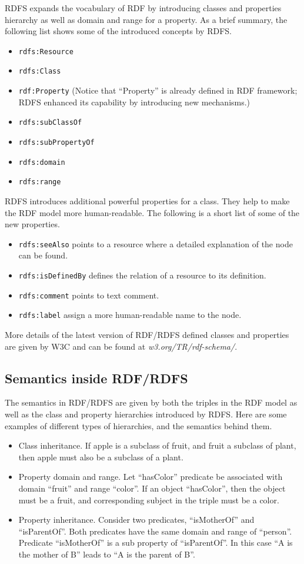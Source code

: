 RDFS expands the vocabulary of RDF by introducing classes and properties hierarchy as well as domain and range for a property. As a brief summary, the following list shows some of the introduced concepts by RDFS.
\begin{itemize}
	\item \verb|rdfs:Resource|
	\item \verb|rdfs:Class|
	\item \verb|rdf:Property| (Notice that ``Property'' is already defined in RDF framework; RDFS enhanced its capability by introducing new mechanisms.)
	\item \verb|rdfs:subClassOf|
	\item \verb|rdfs:subPropertyOf|
	\item \verb|rdfs:domain|
	\item \verb|rdfs:range|
\end{itemize}

RDFS introduces additional powerful properties for a class. They help to make the RDF model more human-readable. The following is a short list of some of the new properties.
\begin{itemize}
	\item \verb|rdfs:seeAlso| points to a resource where a detailed explanation of the node can be found.
	\item \verb|rdfs:isDefinedBy| defines the relation of a resource to its definition.
	\item \verb|rdfs:comment| points to text comment.
	\item \verb|rdfs:label| assign a more human-readable name to the node.
\end{itemize}

More details of the latest version of RDF/RDFS defined classes and properties are given by W3C and can be found at \textit{w3.org/TR/rdf-schema/}.

\subsection{Semantics inside RDF/RDFS}

The semantics in RDF/RDFS are given by both the triples in the RDF model as well as the class and property hierarchies introduced by RDFS. Here are some examples of different types of hierarchies, and the semantics behind them.
\begin{itemize}
	\item Class inheritance. If apple is a subclass of fruit, and fruit a subclass of plant, then apple must also be a subclass of a plant.
	\item Property domain and range. Let ``hasColor'' predicate be associated with domain ``fruit'' and range ``color''. If an object ``hasColor'', then the object must be a fruit, and corresponding subject in the triple must be a color.
	\item Property inheritance. Consider two predicates, ``isMotherOf'' and ``isParentOf''. Both predicates have the same domain and range of ``person''. Predicate ``isMotherOf'' is a sub property of ``isParentOf''. In this case ``A is the mother of B'' leads to ``A is the parent of B''.
\end{itemize}


